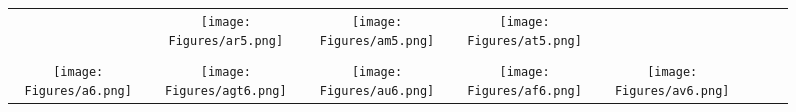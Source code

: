 \documentclass[journal]{IEEEtran}
\begin{document}
\begin{figure*}[!t]
\begin{tabular}{cccccccc}
		&
		\hspace{0.4cm}
		\begin{minipage}{30pt}
			\texttt{[image: Figures/ar5.png]}
\end{minipage}
		&
		\hspace{0.4cm}
		\begin{minipage}{30pt}
			\texttt{[image: Figures/am5.png]}
\end{minipage}
		&
		\hspace{0.4cm}
		\begin{minipage}{30pt}
			\texttt{[image: Figures/at5.png]}
\end{minipage}
		\\
		\\
		\begin{minipage}{30pt}
			\texttt{[image: Figures/a6.png]}
			\centering{(a)}
		\end{minipage}
		&
		\hspace{0.4cm}
		\begin{minipage}{30pt}
			\texttt{[image: Figures/agt6.png]}
			\centering{(b)}
		\end{minipage}
		&
		\hspace{0.4cm}
		\begin{minipage}{30pt}
			\texttt{[image: Figures/au6.png]}
			\centering{(c)}
		\end{minipage}
		&
		\hspace{0.4cm}
		\begin{minipage}{30pt}
			\texttt{[image: Figures/af6.png]}
			\centering{(d)}
		\end{minipage}
		&
		\hspace{0.4cm}
		\begin{minipage}{30pt}
			\texttt{[image: Figures/av6.png]}
			\centering{(e)}
		\end{minipage}
		

\end{tabular}
\end{figure*}
\end{document}
